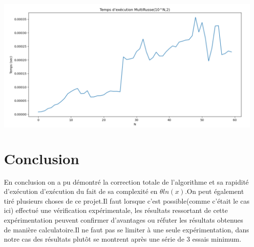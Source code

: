 \documentclass[12pt,a4paper]{report}
\begin{document}
\begin{flushleft}
\begin{center}
\hfill
\begin{minipage}{0.49\linewidth}
\includegraphics[width=\linewidth]{courbePasCleanDuTout}
\end{minipage}
\end{center}
\end{flushleft}

\section*{Conclusion}
\begin{flushleft}

\end{flushleft}
En conclusion on a pu démontré la correction totale de l'algorithme et sa rapidité d'exécution d'exécution du fait de sa complexité en $ \theta ln(x)$.On peut également tiré plusieurs choses de ce projet.Il faut lorsque c'est possible(comme c'était le cas ici) effectué une vérification expérimentale, les résultats ressortant de cette expérimentation peuvent confirmer d'avantages ou réfuter les résultats obtenues de manière calculatoire.Il ne faut pas se limiter à une seule expérimentation, dans notre cas des résultats plutôt se montrent après une série de 3 essais minimum. 
\end{document}
